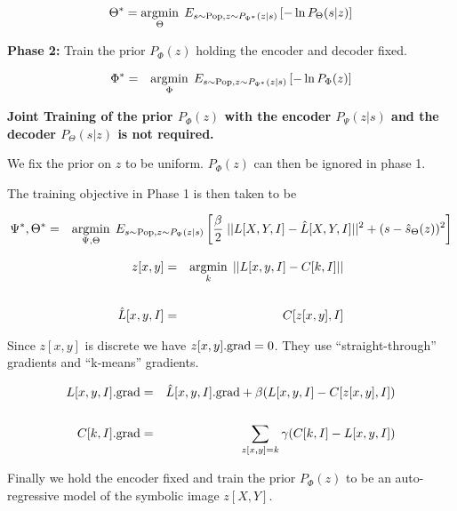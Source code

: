 {{$$\Theta^* = \operatorname*{argmin}_\Theta\;E_{s \sim \mathrm{Pop},z \sim P_{\Psi^*}(z|s)}\left[-\ln P_\Theta(s|z)\right]$$

\vfill
{\bf Phase 2:} Train the prior $P_\Phi(z)$ holding the encoder and decoder fixed.

\begin{eqnarray*}
\Phi^* &  = & \operatorname*{argmin}_{\Phi}\;E_{s\sim \mathrm{Pop},z\sim P_{\Psi^*}(z|s)}\left[-\ln P_\Phi(z)\right]
\end{eqnarray*}

\vfill
{\bf Joint Training of the prior $P_\Phi(z)$ with the encoder $P_\Psi(z|s)$ and the decoder $P_\Theta(s|z)$ is not required.}

}



We fix the prior on $z$ to be uniform.  $P_\Phi(z)$ can then be ignored in phase 1.

\vfill
The training objective in Phase 1 is then taken to be

\vfill
{\huge
\begin{eqnarray*}
\Psi^*,\Theta^* & = & \operatorname*{argmin}_{\Psi,\Theta} \;E_{s\sim \mathrm{Pop},z\sim P_\Psi(z|s)}\left[ \frac{\beta}{2}\;||L[X,Y,I] - \hat{L}[X,Y,I]||^2 + (s-\hat{s}_\Theta(z))^2\right]
\end{eqnarray*}
}



{\huge
\begin{eqnarray*}
z[x,y] & = & \operatorname*{argmin}_k \;||L[x,y,I] - C[k,I]|| \\
\\
\hat{L}[x,y,I] & = & C[z[x,y],I]
\end{eqnarray*}
}

Since $z[x,y]$ is discrete we have $z[x,y].\mathrm{grad} = 0$.
They use ``straight-through'' gradients and ``k-means'' gradients.

{\huge
\begin{eqnarray*}
L[x,y,I].\mathrm{grad} & = & \hat{L}[x,y,I].\mathrm{grad} + \beta(L[x,y,I] - C[z[x,y],I]) \\
\\
C[k,I].\mathrm{grad} & = & \sum_{z[x,y]=k} \gamma(C[k,I] - L[x,y,I])
\end{eqnarray*}
}


Finally we hold the encoder fixed and train the prior $P_\Phi(z)$ to be an auto-regressive model of the symbolic image $z[X,Y]$.


}
